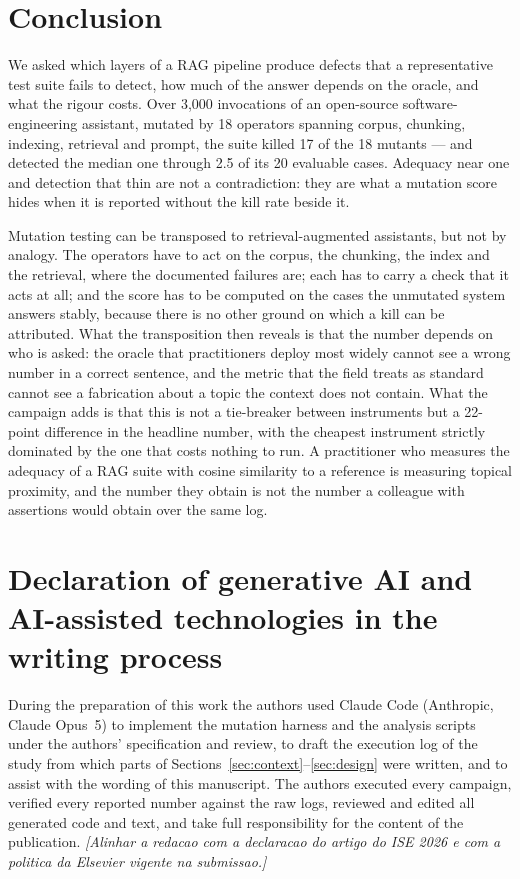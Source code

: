 \documentclass[a4paper,fleqn]{cas-dc}
\newcommand{\nota}[1]{{\color{blue}\itshape [#1]}}
\begin{document}
\section{Conclusion}
\label{sec:conclusion}

We asked which layers of a RAG pipeline produce defects that a representative
test suite fails to detect, how much of the answer depends on the oracle, and
what the rigour costs. Over 3,000 invocations of an open-source
software-engineering assistant, mutated by 18 operators spanning corpus,
chunking, indexing, retrieval and prompt, the suite killed 17 of the 18
mutants --- and detected the median one through 2.5 of its 20 evaluable cases.
Adequacy near one and detection that thin are not a contradiction: they are
what a mutation score hides when it is reported without the kill rate beside
it.

Mutation testing can be transposed to retrieval-augmented assistants, but not
by analogy. The operators have to act on the corpus, the chunking, the index
and the retrieval, where the documented failures are; each has to carry a
check that it acts at all; and the score has to be computed on the cases the
unmutated system answers stably, because there is no other ground on which a
kill can be attributed. What the transposition then reveals is that the
number depends on who is asked: the oracle that practitioners deploy most
widely cannot see a wrong number in a correct sentence, and the metric that
the field treats as standard cannot see a fabrication about a topic the
context does not contain. What the campaign adds is that this is not a
tie-breaker between instruments but a 22-point difference in the headline
number, with the cheapest instrument strictly dominated by the one that costs
nothing to run. A practitioner who measures the adequacy of a RAG suite with
cosine similarity to a reference is measuring topical proximity, and the number
they obtain is not the number a colleague with assertions would obtain over the
same log.

\section*{Declaration of generative AI and AI-assisted technologies in the writing process}

During the preparation of this work the authors used Claude Code (Anthropic,
Claude Opus~5) to implement the mutation harness and the analysis scripts
under the authors' specification and review, to draft the execution log of the
study from which parts of Sections~\ref{sec:context}--\ref{sec:design} were
written, and to assist with the wording of this manuscript. The authors
executed every campaign, verified every reported number against the raw logs,
reviewed and edited all generated code and text, and take full responsibility
for the content of the publication.
\nota{Alinhar a redacao com a declaracao do artigo do ISE 2026 e com a
politica da Elsevier vigente na submissao.}
\end{document}
